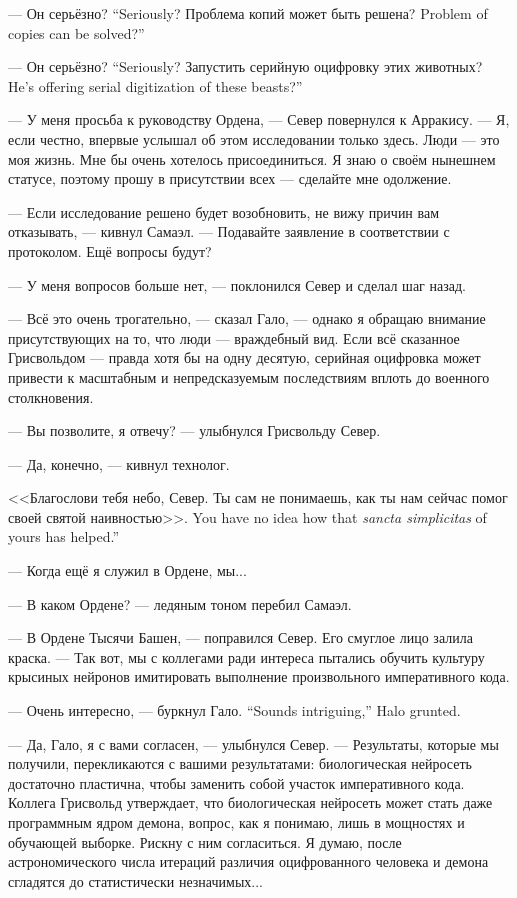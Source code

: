 {--- Он серьёзно?}
{``Seriously?}
{Проблема копий может быть решена?}
{Problem of copies can be solved?''}

{--- Он серьёзно?}
{``Seriously?}
{Запустить серийную оцифровку этих животных?}
{He's offering serial digitization of these beasts?''}

--- У меня просьба к руководству Ордена, --- Север повернулся к Арракису.
--- Я, если честно, впервые услышал об этом исследовании только здесь.
Люди --- это моя жизнь.
Мне бы очень хотелось присоединиться.
Я знаю о своём нынешнем статусе, поэтому прошу в присутствии всех --- сделайте мне одолжение.

--- Если исследование решено будет возобновить, не вижу причин вам отказывать, --- кивнул Самаэл.
--- Подавайте заявление в соответствии с протоколом.
Ещё вопросы будут?

--- У меня вопросов больше нет, --- поклонился Север и сделал шаг назад.

--- Всё это очень трогательно, --- сказал Гало, --- однако я обращаю внимание присутствующих на то, что люди --- враждебный вид.
Если всё сказанное Грисвольдом --- правда хотя бы на одну десятую, серийная оцифровка может привести к масштабным и непредсказуемым последствиям вплоть до военного столкновения.

--- Вы позволите, я отвечу? --- улыбнулся Грисвольду Север.

--- Да, конечно, --- кивнул технолог.

<<Благослови тебя небо, Север.
{Ты сам не понимаешь, как ты нам сейчас помог своей святой наивностью>>.}
{You have no idea how that \textit{sancta simplicitas} of yours has helped.''}

--- Когда ещё я служил в Ордене, мы...

--- В каком Ордене? --- ледяным тоном перебил Самаэл.

--- В Ордене Тысячи Башен, --- поправился Север.
Его смуглое лицо залила краска.
--- Так вот, мы с коллегами ради интереса пытались обучить культуру крысиных нейронов имитировать выполнение произвольного императивного кода.

{--- Очень интересно, --- буркнул Гало.}
{``Sounds intriguing,'' Halo grunted.}

--- Да, Гало, я с вами согласен, --- улыбнулся Север.
--- Результаты, которые мы получили, перекликаются с вашими результатами: биологическая нейросеть достаточно пластична, чтобы заменить собой участок императивного кода.
Коллега Грисвольд утверждает, что биологическая нейросеть может стать даже программным ядром демона, вопрос, как я понимаю, лишь в мощностях и обучающей выборке.
Рискну с ним согласиться.
Я думаю, после астрономического числа итераций различия оцифрованного человека и демона сгладятся до статистически незначимых...

